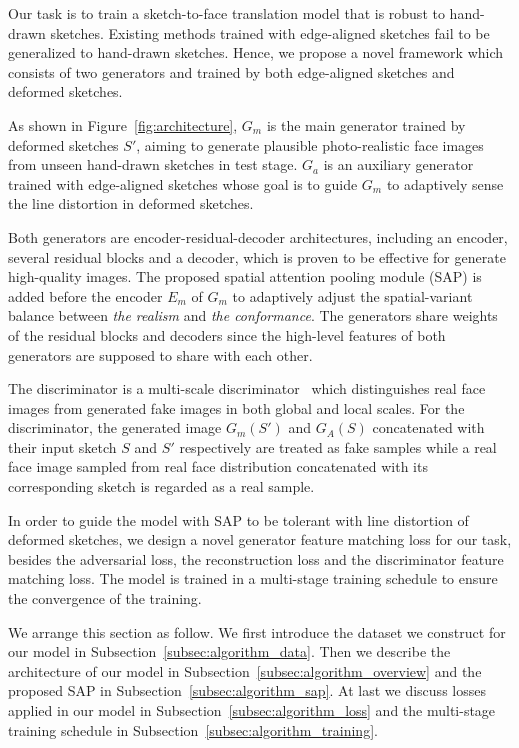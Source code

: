 % 

Our task is to train a sketch-to-face translation model that is robust to hand-drawn sketches. Existing methods trained with edge-aligned sketches fail to be generalized to hand-drawn sketches. Hence, we propose a novel framework which consists of two generators and trained by both edge-aligned sketches and deformed sketches.

As shown in Figure~\ref{fig:architecture}, $G_m$ is the main generator trained by deformed sketches $S'$, aiming to generate plausible photo-realistic face images from unseen hand-drawn sketches in test stage. 
$G_a$ is an auxiliary generator trained with edge-aligned sketches whose goal is to guide $G_m$ to adaptively sense the line distortion in deformed sketches.

Both generators are encoder-residual-decoder architectures, including an encoder, several residual blocks and a decoder, which is proven to be effective for generate high-quality images. 
The proposed spatial attention pooling module (SAP) is added before the encoder $E_m$ of $G_m$ to adaptively adjust the spatial-variant balance between \textit{the realism} and \textit{the conformance}. 
The generators share weights of the residual blocks and decoders since the high-level features of both generators are supposed to share with each other.


%
The discriminator is a multi-scale discriminator~\cite{pix2pixHD} which distinguishes real face images from generated fake images in both global and local scales.
For the discriminator, the generated image $G_m(S')$ and $G_A(S)$ concatenated with their input sketch $S$ and $S'$ respectively are treated as fake samples while a real face image sampled from real face distribution concatenated with its corresponding sketch is regarded as a real sample. 
%

In order to guide the model with SAP to be tolerant with line distortion of deformed sketches, we design a novel generator feature matching loss for our task, besides the adversarial loss, the reconstruction loss and the discriminator feature matching loss. The model is trained in a multi-stage training schedule to ensure the convergence of the training.
%

We arrange this section as follow. We first introduce the dataset we construct for our model in Subsection~\ref{subsec:algorithm_data}.
Then we describe the architecture of our model in Subsection~\ref{subsec:algorithm_overview} and the proposed SAP in Subsection~\ref{subsec:algorithm_sap}.
At last we discuss losses applied in our model in Subsection~\ref{subsec:algorithm_loss} and the multi-stage training schedule in Subsection~\ref{subsec:algorithm_training}.

